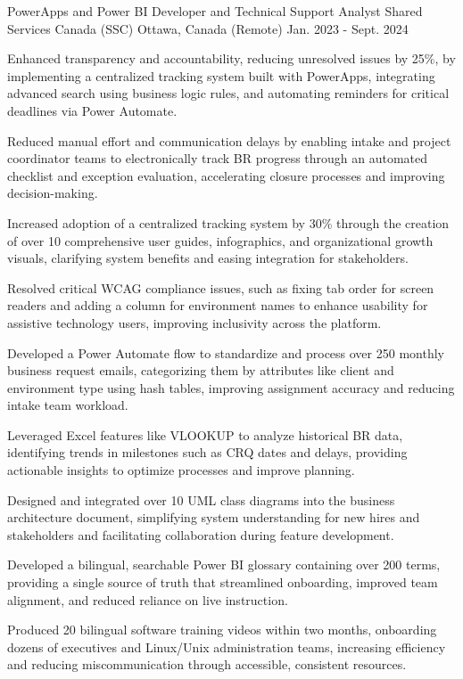 \begin{cventries}
\cventry
  {PowerApps and Power BI Developer and Technical Support Analyst} %
  {Shared Services Canada (SSC)} %
  {Ottawa, Canada (Remote)} %
  {Jan. 2023 - Sept. 2024} %
  { %
    \begin{cvitems}
      \item {Enhanced transparency and accountability, reducing unresolved issues by 25\%, by implementing a centralized tracking system built with PowerApps, integrating advanced search using business logic rules, and automating reminders for critical deadlines via Power Automate.}
      \item {Reduced manual effort and communication delays by enabling intake and project coordinator teams to electronically track BR progress through an automated checklist and exception evaluation, accelerating closure processes and improving decision-making.}
      \item {Increased adoption of a centralized tracking system by 30\% through the creation of over 10 comprehensive user guides, infographics, and organizational growth visuals, clarifying system benefits and easing integration for stakeholders.}
      \item {Resolved critical WCAG compliance issues, such as fixing tab order for screen readers and adding a column for environment names to enhance usability for assistive technology users, improving inclusivity across the platform.}
      \item {Developed a Power Automate flow to standardize and process over 250 monthly business request emails, categorizing them by attributes like client and environment type using hash tables, improving assignment accuracy and reducing intake team workload.}
      \item {Leveraged Excel features like VLOOKUP to analyze historical BR data, identifying trends in milestones such as CRQ dates and delays, providing actionable insights to optimize processes and improve planning.}
      \item {Designed and integrated over 10 UML class diagrams into the business architecture document, simplifying system understanding for new hires and stakeholders and facilitating collaboration during feature development.}
      \item {Developed a bilingual, searchable Power BI glossary containing over 200 terms, providing a single source of truth that streamlined onboarding, improved team alignment, and reduced reliance on live instruction.}
      \item {Produced 20 bilingual software training videos within two months, onboarding dozens of executives and Linux/Unix administration teams, increasing efficiency and reducing miscommunication through accessible, consistent resources.}
    \end{cvitems}
  }


\end{cventries}

